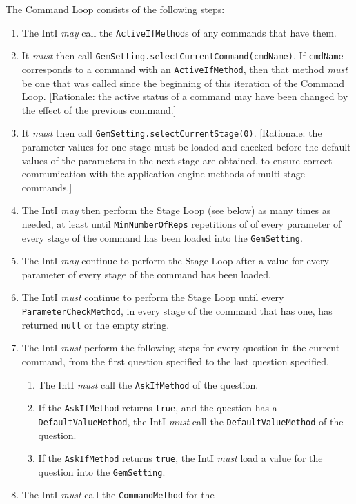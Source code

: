 \documentclass[11pt]{article}
\newcommand{\must}{{\it must}}
\newcommand{\may}{{\it may}}
\newcounter{coreReq}
\begin{document}
\noindent
The Command Loop consists of the following steps:
\begin{enumerate}
\setcounter{enumi}{\value{coreReq}}
\item The IntI {\may} call the {\tt ActiveIfMethod}s of any commands
  that have them.
\item It {\must} then call
  {\tt GemSetting.selectCurrentCommand(cmdName)}.  If {\tt cmdName}
  corresponds to a command with an {\tt ActiveIfMethod}, then that method
  {\must} be one that was called since the beginning of this iteration of
  the Command Loop.  [Rationale:  the active status of a command may have
  been changed by the effect of the previous command.]
\item It {\must} then call {\tt GemSetting.selectCurrentStage(0)}.
  [Rationale: the parameter values for one stage must be loaded and checked
  before the default values of the parameters in the next stage are
  obtained, to ensure correct communication with the application
  engine methods of multi-stage commands.]
\item The IntI {\may} then perform the Stage Loop (see below)
  as many
  times as needed, at least until {\tt MinNumberOfReps} repetitions of of
  every parameter of every stage of the command has been loaded into the
  {\tt GemSetting}.
\item The IntI {\may} continue to perform the Stage Loop
  after a value for every parameter of every stage of the command has been
  loaded.
\item The IntI {\must} continue to perform the Stage Loop until
  every {\tt ParameterCheckMethod}, in every stage of the command that
  has one, has returned {\tt null} or the empty string.
\item The IntI {\must} perform the following steps
  for every question in the current command,
  from the first question specified to the last question specified.
  \begin{enumerate}
  \item The IntI {\must} call the {\tt AskIfMethod} of the question.
  \item If the {\tt AskIfMethod} returns {\tt true}, and the question
    has a {\tt DefaultValueMethod}, the IntI {\must}
    call the {\tt DefaultValueMethod} of the question.
  \item If the {\tt AskIfMethod} returns {\tt true}, the IntI {\must}
    load a value for the question into the {\tt GemSetting}.
  \end{enumerate}
\item The IntI {\must} call the {\tt CommandMethod} for the

\end{enumerate}
\end{document}
